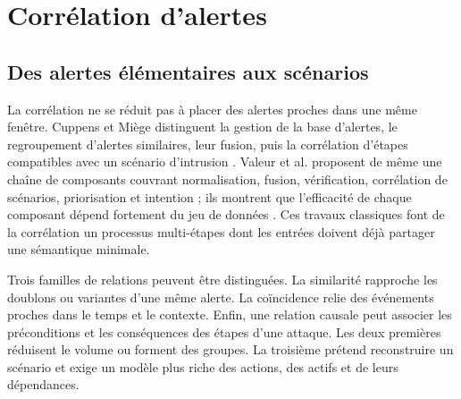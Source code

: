 
\section{Corrélation d'alertes}

\subsection{Des alertes élémentaires aux scénarios}

La corrélation ne se réduit pas à placer des alertes proches dans une même fenêtre.
Cuppens et Miège distinguent la gestion de la base d'alertes, le regroupement d'alertes
similaires, leur fusion, puis la corrélation d'étapes compatibles avec un scénario
d'intrusion \cite{cuppens2002alert}. Valeur et al. proposent de même une chaîne de
composants couvrant normalisation, fusion, vérification, corrélation de scénarios,
priorisation et intention ; ils montrent que l'efficacité de chaque composant dépend
fortement du jeu de données \cite{valeur2004correlation}. Ces travaux classiques font de
la corrélation un processus multi-étapes dont les entrées doivent déjà partager une
sémantique minimale.

Trois familles de relations peuvent être distinguées. La similarité rapproche les
doublons ou variantes d'une même alerte. La coïncidence relie des événements proches dans
le temps et le contexte. Enfin, une relation causale peut associer les préconditions et
les conséquences des étapes d'une attaque. Les deux premières réduisent le volume ou
forment des groupes. La troisième prétend reconstruire un scénario et exige un modèle
plus riche des actions, des actifs et de leurs dépendances.

